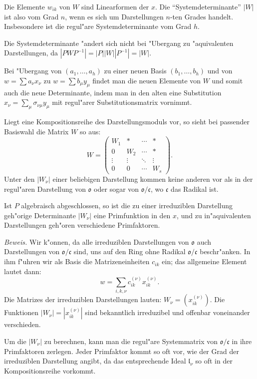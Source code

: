 \documentclass[12pt,a4paper]{article}
\theoremstyle{plain}
\begin{document}
Die Elemente $w_{ik}$ von $W$ sind Linearformen der $x$. Die ``Systemdeterminante'' $|W|$ ist also vom Grad $n$, wenn es sich um Darstellungen $n$-ten Grades handelt. Insbesondere ist die regul"are Systemdeterminante vom Grad $h$.

Die Systemdeterminante "andert sich nicht bei "Ubergang zu "aquivalenten Darstellungen, da $|PWP^{-1}| = |P||W||P^{-1}| = |W|$.

Bei "Ubergang von $(a_1,\ldots,a_h)$ zu einer neuen Basis $(b_1,\ldots,b_h)$ und von $w = \sum a_\nu x_\nu$ zu $w = \sum b_\mu y_\mu$ findet man die neuen Elemente von $W$ und somit auch die neue Determinante, indem man in den alten eine Substitution $x_\nu = \sum_\mu \sigma_{\nu\mu} y_\mu$ mit regul"arer Substitutionsmatrix vornimmt.

Liegt eine Kompositionsreihe des Darstellungsmoduls vor, so sieht bei passender Basiswahl die Matrix $W$ so aus:
\[
W = \begin{pmatrix}
W_1 & * & \cdots & * \\
0 & W_2 & \cdots & * \\
\vdots & \vdots & \ddots & \vdots \\
0 & 0 & \cdots & W_s
\end{pmatrix}.
\]
Unter den $|W_\nu|$ einer beliebigen Darstellung kommen keine anderen vor als in der regul"aren Darstellung von $\mathfrak{o}$ oder sogar von $\mathfrak{o}/\mathfrak{c}$, wo $\mathfrak{c}$ das Radikal ist.

Ist $P$ algebraisch abgeschlossen, so ist die zu einer irreduziblen Darstellung geh"orige Determinante $|W_\nu|$ eine Primfunktion in den $x$, und zu in"aquivalenten Darstellungen geh"oren verschiedene Primfaktoren.

\noindent\textit{Beweis.}
Wir k"onnen, da alle irreduziblen Darstellungen von $\mathfrak{o}$ auch Darstellungen von $\mathfrak{o}/\mathfrak{c}$ sind, uns auf den Ring ohne Radikal $\mathfrak{o}/\mathfrak{c}$ beschr"anken. In ihm f"uhren wir als Basis die Matrizeneinheiten $c_{ik}$ ein; das allgemeine Element lautet dann:
\[
w = \sum_{i,k,\nu} c^{(\nu)}_{ik} x^{(\nu)}_{ik}.
\]
Die Matrizes der irreduziblen Darstellungen lauten: $W_\nu = (x^{(\nu)}_{ik})$. Die Funktionen $|W_\nu| = |x^{(\nu)}_{ik}|$ sind bekanntlich irreduzibel und offenbar voneinander verschieden.

Um die $|W_\nu|$ zu berechnen, kann man die regul"are Systemmatrix von $\mathfrak{o}/\mathfrak{c}$ in ihre Primfaktoren zerlegen. Jeder Primfaktor kommt so oft vor, wie der Grad der irreduziblen Darstellung angibt, da das entsprechende Ideal $\mathfrak{l}_\nu$ so oft in der Kompositionsreihe vorkommt.
\end{document}
